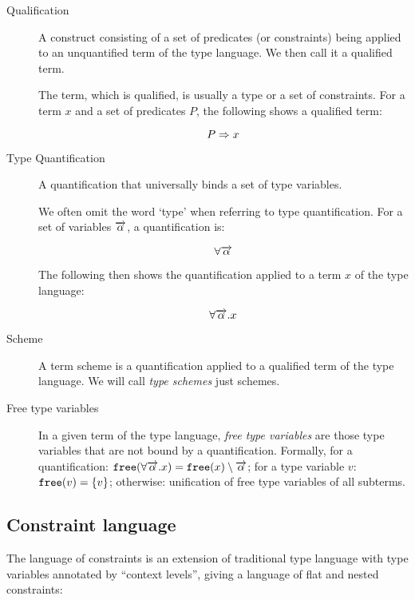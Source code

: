 \begin{description}
    \item[Qualification] A construct consisting of a set of predicates (or constraints) being applied to an unquantified term of the type language. We then call it a qualified term.

    The term, which is qualified, is usually a type or a set of constraints. For a term $x$ and a set of predicates $P$, the following shows a qualified term:

    $$P \Rightarrow x$$

    \item[Type Quantification] A quantification that universally binds a set of type variables.

    We often omit the word `type' when referring to type quantification. For a set of variables $\overrightarrow{\alpha}$, a quantification is:

    $$\forall \overrightarrow{\alpha}$$

    The following then shows the quantification applied to a term $x$ of the type language:

    $$\forall \overrightarrow{\alpha} . x$$

    \item[Scheme] A term scheme is a quantification applied to a qualified term of the type language. We will call \emph{type schemes} just schemes.

    \item[Free type variables] In a given term of the type language, \emph{free type variables} are those type variables that are not bound by a quantification. Formally, for a quantification: $\mathtt{free} (\forall \overrightarrow{\alpha} . x) = \mathtt{free} (x) \setminus \overrightarrow{\alpha}$; for a type variable $v$: $\mathtt{free} (v) = \{v\}$; otherwise: unification of free type variables of all subterms.
\end{description}

\subsection{Constraint language}

The language of constraints is an extension of traditional type language with type variables annotated by ``context levels'', giving a language of flat and nested constraints:

